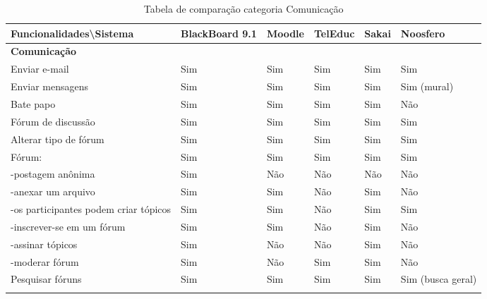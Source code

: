\begin{landscape}
\begin{table}[H]
\begin{tabular}{|@{}p{5.5cm}|p{3.5cm}|p{3.5cm}|p{3.5cm}|p{3.5cm}|p{3.5cm}@{}|}
\hline
\textbf{Funcionalidades\textbackslash Sistema} & \textbf{BlackBoard 9.1} & \textbf{Moodle} & \textbf{TelEduc} & \textbf{Sakai} & \textbf{Noosfero}\\ \hline
\textbf{Comunicação} & & & & & \\
Enviar e-mail & Sim & Sim & Sim& Sim   & Sim    \\
Enviar mensagens& Sim & Sim & Sim& Sim   & Sim {\tiny(mural)}\\
Bate papo& Sim & Sim & Sim& Sim   & Não    \\
Fórum de discussão& Sim & Sim & Sim& Sim   & Sim    \\
Alterar tipo de fórum & Sim & Sim & Sim& Sim   & Sim \\
Fórum:   & Sim & Sim & Sim& Sim   & Sim    \\
-postagem anônima & Sim & Não & Não& Não   & Não    \\
-anexar um arquivo& Sim & Sim & Não& Sim   & Não    \\
-os participantes podem criar tópicos   & Sim & Sim & Não& Sim   & Sim    \\
-inscrever-se em um fórum  & Sim & Sim & Não& Sim   & Não    \\
-assinar tópicos& Sim & Não & Não& Sim   & Não    \\
-moderar fórum& Sim & Não & Sim& Sim   & Não    \\
Pesquisar fóruns& Sim & Sim & Sim& Sim   & Sim {\tiny (busca geral)} \\
 & & & & & \\ \hline
\end{tabular}
\caption{Tabela de comparação categoria Comunicação}
\label{tab:comunicacao}
\end{table}


\end{landscape}
